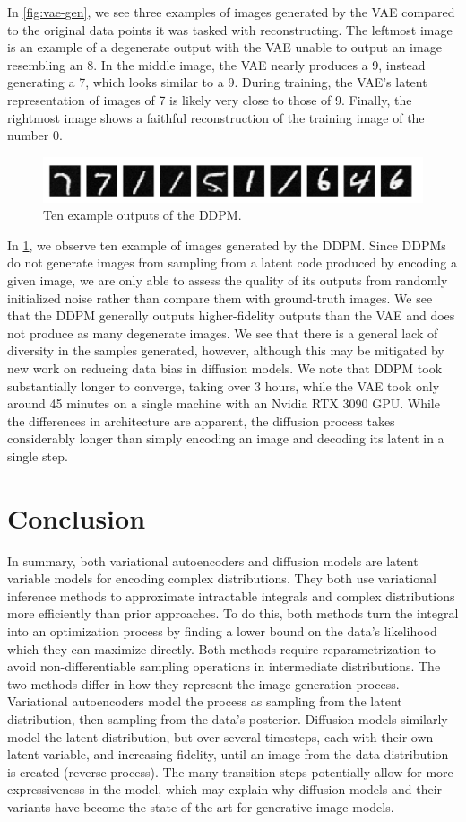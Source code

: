 \documentclass{article}
\begin{document}
In \ref{fig:vae-gen}, we see three examples of images generated by the VAE compared to the original data points it was tasked with reconstructing. The leftmost image is an example of a degenerate output with the VAE unable to output an image resembling an 8. In the middle image, the VAE nearly produces a 9, instead generating a 7, which looks similar to a 9. During training, the VAE's latent representation of images of 7 is likely very close to those of 9. Finally, the rightmost image shows a faithful reconstruction of the training image of the number 0.
\begin{figure}
    \centering
    \includegraphics[scale=0.25]{ddpm_outputs_10.png}
    \caption{Ten example outputs of the DDPM.}
    \label{fig:ddpm-gen}
\end{figure}
In \ref{fig:ddpm-gen}, we observe ten example of images generated by the DDPM. Since DDPMs do not generate images from sampling from a latent code produced by encoding a given image, we are only able to assess the quality of its outputs from randomly initialized noise rather than compare them with ground-truth images. We see that the DDPM generally outputs higher-fidelity outputs than the VAE and does not produce as many degenerate images. We see that there is a general lack of diversity in the samples generated, however, although this may be mitigated by new work on reducing data bias in diffusion models. We note that DDPM took substantially longer to converge, taking over 3 hours, while the VAE took only around 45 minutes on a single machine with an Nvidia RTX 3090 GPU. While the differences in architecture are apparent, the diffusion process takes considerably longer than simply encoding an image and decoding its latent in a single step.
\section{Conclusion}
In summary, both variational autoencoders and diffusion models are latent variable models for encoding complex distributions. They both use variational inference methods to approximate intractable integrals and complex distributions more efficiently than prior approaches. To do this, both methods turn the integral into an optimization process by finding a lower bound on the data's likelihood which they can maximize directly. Both methods require reparametrization to avoid non-differentiable sampling operations in intermediate distributions.  The two methods differ in how they represent the image generation process. Variational autoencoders model the process as sampling from the latent distribution, then sampling from the data's posterior. Diffusion models similarly model the latent distribution, but over several timesteps, each with their own latent variable, and increasing fidelity, until an image from the data distribution is created (reverse process). The many transition steps potentially allow for more expressiveness in the model, which may explain why diffusion models and their variants have become the state of the art for generative image models.
\clearpage


\end{document}
